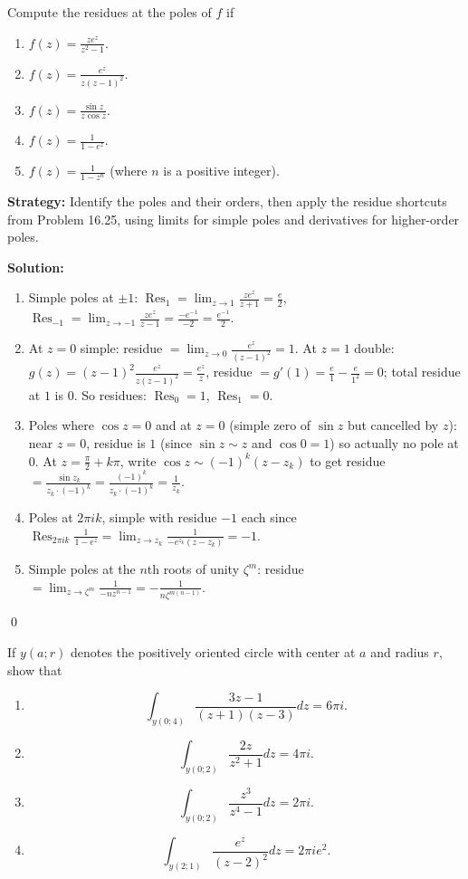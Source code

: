\begin{problembox}
Compute the residues at the poles of \( f \) if
\begin{enumerate}[label=(\alph*)]
\item \( f(z) = \frac{ze^z}{z^2 - 1} \).
\item \( f(z) = \frac{e^z}{z(z - 1)^2} \).
\item \( f(z) = \frac{\sin z}{z \cos z} \).
\item \( f(z) = \frac{1}{1 - e^z} \).
\item \( f(z) = \frac{1}{1 - z^n} \) (where \( n \) is a positive integer).
\end{enumerate}
\end{problembox}

\noindent\textbf{Strategy:} Identify the poles and their orders, then apply the residue shortcuts from Problem 16.25, using limits for simple poles and derivatives for higher-order poles.

\bigskip\noindent\textbf{Solution:}
\begin{enumerate}[label=(\alph*)]
\item Simple poles at $\pm1$: $\operatorname{Res}_{1}=\lim_{z\to1}\frac{ze^z}{z+1}=\tfrac{e}{2}$, $\operatorname{Res}_{-1}=\lim_{z\to-1}\frac{ze^z}{z-1}=\tfrac{-e^{-1}}{-2}=\tfrac{e^{-1}}{2}$.
\item At $z=0$ simple: residue $=\lim_{z\to0}\frac{e^z}{(z-1)^2}=1$. At $z=1$ double: $g(z)=(z-1)^2\frac{e^z}{z(z-1)^2}=\frac{e^z}{z}$, residue $=g'(1)=\frac{e}{1}-\frac{e}{1^2}=0$; total residue at $1$ is $0$. So residues: $\operatorname{Res}_0=1$, $\operatorname{Res}_1=0$.
\item Poles where $\cos z=0$ and at $z=0$ (simple zero of $\sin z$ but cancelled by $z$): near $z=0$, residue is $1$ (since $\sin z\sim z$ and $\cos 0=1$) so actually no pole at $0$. At $z=\frac{\pi}{2}+k\pi$, write $\cos z\sim (-1)^k(z-z_k)$ to get residue $=\frac{\sin z_k}{z_k\cdot(-1)^k}=\frac{(-1)^k}{z_k\cdot(-1)^k}=\frac{1}{z_k}$.
\item Poles at $2\pi i k$, simple with residue $-1$ each since $\operatorname{Res}_{2\pi i k}\frac{1}{1-e^z}=\lim_{z\to z_k}\frac{1}{-e^{z_k}(z-z_k)}=-1$.
\item Simple poles at the $n$th roots of unity $\zeta^m$: residue $=\lim_{z\to\zeta^m}\frac{1}{-n z^{n-1}}=-\frac{1}{n\zeta^{m(n-1)}}$.
\end{enumerate}\qed


\begin{problembox}
If \( y(a; r) \) denotes the positively oriented circle with center at \( a \) and radius \( r \), show that
\begin{enumerate}[label=(\alph*)]
\item \[ \int_{y(0;4)} \frac{3z - 1}{(z + 1)(z - 3)} dz = 6\pi i. \]
\item \[ \int_{y(0;2)} \frac{2z}{z^2 + 1} dz = 4\pi i. \]
\item \[ \int_{y(0;2)} \frac{z^3}{z^4 - 1} dz = 2\pi i. \]
\item \[ \int_{y(2;1)} \frac{e^z}{(z - 2)^2} dz = 2\pi ie^2. \]
\end{enumerate}
\end{problembox}

